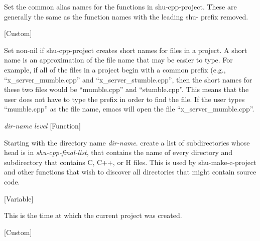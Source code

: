 \begin{doc-string}
Set the common alias names for the functions in shu-cpp-project.
These are generally the same as the function names with the leading
shu- prefix removed.
\end{doc-string}

\vspace{1em}
\noindent
{}
\usebox{\funcname}
 \hfill [Custom]

\begin{doc-string}
Set non-nil if shu-cpp-project creates short names for files in a project.  A
short name is an approximation of the file name that may be easier to type.  For
example, if all of the files in a project begin with a common prefix (e.g.,
``x\_server\_mumble.cpp'' and ``x\_server\_stumble.cpp'', then the short names for
these two files would be ``mumble.cpp'' and ``stumble.cpp''.  This means that
the user does not have to type the prefix in order to find the file.  If the
user types ``mumble.cpp'' as the file name, emacs will open the file
``x\_server\_mumble.cpp''.
\end{doc-string}

\vspace{1em}
\noindent
{}
\usebox{\funcname}\emph{dir-name} \emph{level}
 \hfill [Function]

\begin{doc-string}
Starting with the directory name \emph{dir-name}. create a list of subdirectories
whose head is in \emph{shu-cpp-final-list}, that contains the name of every directory and
subdirectory that contains C, C++, or H files.  This is used by shu-make-c-project
and other functions that wish to discover all directories that might contain
source code.
\end{doc-string}

\vspace{1em}
\noindent
{}
\usebox{\funcname}
 \hfill [Variable]

\begin{doc-string}
This is the time at which the current project was created.
\end{doc-string}

\vspace{1em}
\noindent
{}
\usebox{\funcname}
 \hfill [Custom]

